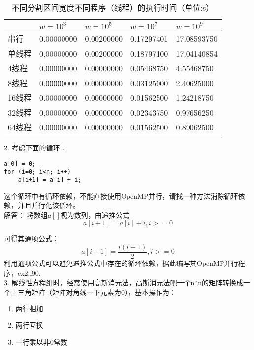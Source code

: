 \documentclass{ctexart}
\begin{document}
\begin{table}[]
    \caption{不同分割区间宽度不同程序（线程）的执行时间（单位:s）}
\label{tab:wvstime}
\centering
\begin{tabular}{@{}lllll@{}}
    \toprule
   & $w=10^3$ & $w=10^5$ & $w=10^7$ & $w=10^9$ \\ \midrule
串行   &0.00000000          &0.00200000          &0.17297401          & 17.08593750          \\
单线程 &0.00000000          &0.00200000          &0.18797100          &17.04140854          \\
4线程  &0.00000000          &0.00000000          & 0.05468750          &4.55468750        \\
8线程  &0.00000000          &0.00000000          &0.03125000          &2.40625000          \\
16线程 &0.00000000          &0.00000000          & 0.01562500          &1.24218750          \\
32线程 &0.00000000          &0.00000000          &0.02343750          &0.97656250 \\
64线程 &0.00000000          &0.00000000          &0.01562500          &0.89062500 \\ \bottomrule
\end{tabular}
\end{table}

2. 考虑下面的循环：

\begin{lstlisting}
a[0] = 0;
for (i=0; i<n; i++)
	a[i+1] = a[i] + i;
\end{lstlisting}

这个循环中有循环依赖，不能直接使用OpenMP并行，请找一种方法消除循环依赖，并且并行化该循环。
\\

{\heiti 解答：}
将数组$a[]$视为数列，由递推公式
$$
a[i+1] = a[i]+i, i>=0
$$

可得其通项公式：
$$
a[i+1] = \frac{i(i+1)}{2}, i>=0
$$
利用通项公式可以避免递推公式中存在的循环依赖，据此编写其OpenMP并行程序，ex2.f90.
\\

3. 解线性方程组时，经常使用高斯消元法，高斯消元法吧一个n*n的矩阵转换成一个上三角矩阵（矩阵对角线一下元素为0），基本操作为：
\begin{enumerate}
\item 两行相加
\item 两行互换
\item 一行乘以非0常数
\end{enumerate}
\end{document}

